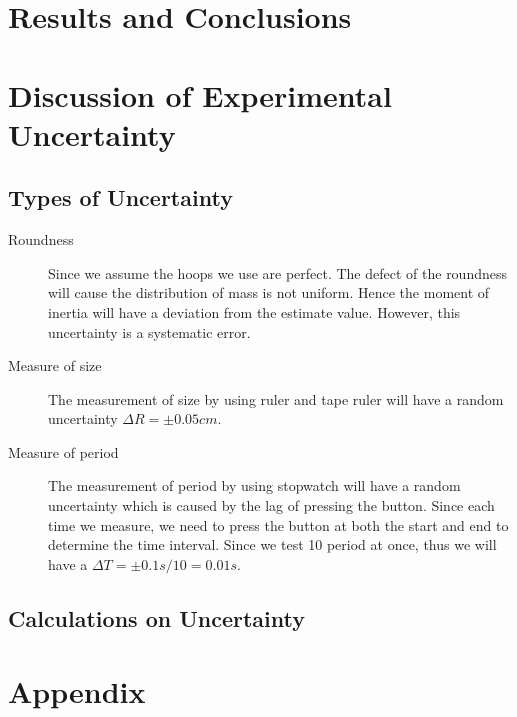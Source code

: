 \documentclass[11pt]{article}
\begin{document}
\section{Results and Conclusions}


\section{Discussion of Experimental Uncertainty}
\subsection{Types of Uncertainty}
\begin{description}
\item[Roundness]
Since we assume the hoops we use are perfect. The defect of the roundness will cause the distribution of mass is not uniform. Hence the moment of inertia will have a deviation from the estimate value. However, this uncertainty is a systematic error.

\item[Measure of size]
The measurement of size by using ruler and tape ruler will have a random uncertainty $\Delta R=\pm0.05cm$.

\item[Measure of period]
The measurement of period by using stopwatch will have a random uncertainty which is caused by the lag of pressing the button. Since each time we measure, we need to press the button at both the start and end to determine the time interval. Since we test 10 period at once, thus we will have a $\Delta T=\pm0.1s/10=0.01s$.

\end{description}
\subsection{Calculations on Uncertainty}
\section{Appendix}
\end{document}
